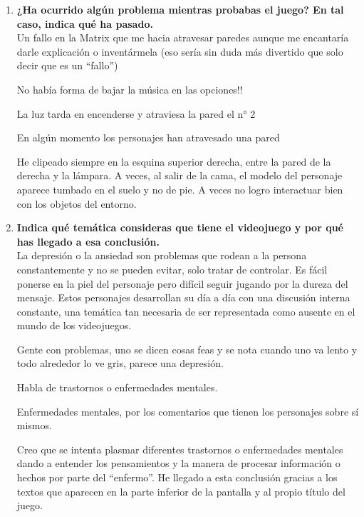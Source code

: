 \documentclass[12pt, a4paper,twoside,titlepage]{book}
\begin{document}
\begin{enumerate}[label=\textbf{\arabic*}.]
	 \item \textbf{¿Ha ocurrido algún problema mientras probabas el juego? En tal caso, indica qué ha pasado.}\\
		Un fallo en la Matrix que me hacia atravesar paredes aunque me encantaría darle explicación o inventármela (eso sería sin duda más divertido que solo decir que es un ``fallo'')
		
		No había forma de bajar la música en las opciones!!
		
		La luz tarda en encenderse y atraviesa la pared el n° 2
		
		En algún momento los personajes han atravesado una pared
		
		He clipeado siempre en la esquina superior derecha, entre la pared de la derecha y la lámpara. A veces, al salir de la cama, el modelo del personaje aparece tumbado en el suelo y no de pie. A veces no logro interactuar bien con los objetos del entorno. 
	 
	 \item \textbf{Indica qué temática consideras que tiene el videojuego y por qué has llegado a esa conclusión.}\\	 
		La depresión o la ansiedad son problemas que rodean a la persona constantemente y no se pueden evitar, solo tratar de controlar. Es fácil ponerse en la piel del personaje pero difícil seguir jugando por la dureza del mensaje. Estos personajes desarrollan su día a día con una discusión interna constante, una temática tan necesaria de ser representada como ausente en el mundo de los videojuegos.
		
		Gente con problemas, uno se dicen cosas feas y se nota cuando uno va lento y todo alrededor lo ve gris, parece una depresión.
		
		Habla de trastornos o enfermedades mentales.
		
		Enfermedades mentales, por los comentarios que tienen los personajes sobre sí mismos.
		
		Creo que se intenta plasmar diferentes trastornos o enfermedades mentales dando a entender los pensamientos y la manera de procesar información o hechos por parte del ``enfermo''. He llegado a esta conclusión gracias a los textos que aparecen en la parte inferior de la pantalla y al propio título del juego.
		

\end{enumerate}
\end{document}
